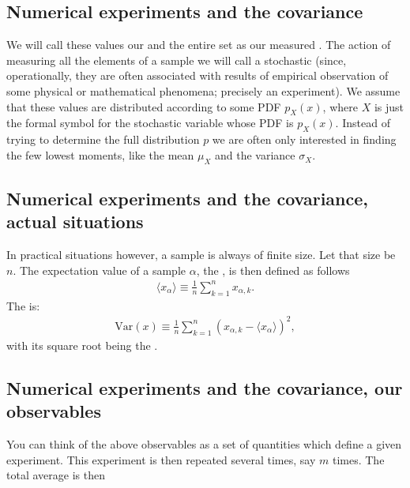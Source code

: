 \documentclass[letterpaper,10pt,english]{sphinxmanual}
\begin{document}
\subsection{Numerical experiments and the covariance}
\label{\detokenize{chapter2:id4}}
We will call these
values our  and the entire set as our measured
.  The action of measuring all the elements of a sample
we will call a stochastic  (since, operationally,
they are often associated with results of empirical observation of
some physical or mathematical phenomena; precisely an experiment). We
assume that these values are distributed according to some
PDF \(p_X^{\phantom X}(x)\), where \(X\) is just the formal symbol for the
stochastic variable whose PDF is \(p_X^{\phantom X}(x)\). Instead of
trying to determine the full distribution \(p\) we are often only
interested in finding the few lowest moments, like the mean
\(\mu_X^{\phantom X}\) and the variance \(\sigma_X^{\phantom X}\).


\subsection{Numerical experiments and the covariance, actual situations}
\label{\detokenize{chapter2:numerical-experiments-and-the-covariance-actual-situations}}
In practical situations however, a sample is always of finite size. Let that
size be \(n\). The expectation value of a sample \(\alpha\), the , is then defined as follows
\begin{equation*}
\begin{split}
\langle x_{\alpha} \rangle \equiv \frac{1}{n}\sum_{k=1}^n x_{\alpha,k}.
\end{split}
\end{equation*}
The  is:
\begin{equation*}
\begin{split}
\mathrm{Var}(x) \equiv \frac{1}{n}\sum_{k=1}^n (x_{\alpha,k} - \langle x_{\alpha} \rangle)^2,
\end{split}
\end{equation*}
with its square root being the .


\subsection{Numerical experiments and the covariance, our observables}
\label{\detokenize{chapter2:numerical-experiments-and-the-covariance-our-observables}}
You can think of the above observables as a set of quantities which define
a given experiment. This experiment is then repeated several times, say \(m\) times.
The total average is then
\end{document}
